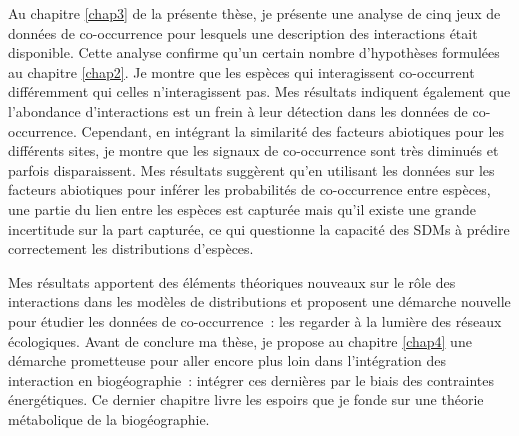Au chapitre \ref{chap3} de la présente thèse, je présente une analyse de
cinq jeux de données de co-occurrence pour lesquels une description des
interactions était disponible. Cette analyse confirme qu'un certain
nombre d'hypothèses formulées au chapitre \ref{chap2}. Je montre que les
espèces qui interagissent co-occurrent différemment qui celles
n'interagissent pas. Mes résultats indiquent également que l'abondance
d'interactions est un frein à leur détection dans les données de
co-occurrence. Cependant, en intégrant la similarité des facteurs
abiotiques pour les différents sites, je montre que les signaux de
co-occurrence sont très diminués et parfois disparaissent. Mes résultats
suggèrent qu'en utilisant les données sur les facteurs abiotiques pour
inférer les probabilités de co-occurrence entre espèces, une partie du
lien entre les espèces est capturée mais qu'il existe une grande
incertitude sur la part capturée, ce qui questionne la capacité des SDMs
à prédire correctement les distributions d'espèces.

Mes résultats apportent des éléments théoriques nouveaux sur le rôle des
interactions dans les modèles de distributions et proposent une démarche
nouvelle pour étudier les données de co-occurrence~: les regarder à la
lumière des réseaux écologiques. Avant de conclure ma thèse, je propose
au chapitre \ref{chap4} une démarche prometteuse pour aller encore plus
loin dans l'intégration des interaction en biogéographie~: intégrer ces
dernières par le biais des contraintes énergétiques. Ce dernier chapitre
livre les espoirs que je fonde sur une théorie métabolique de la
biogéographie.
